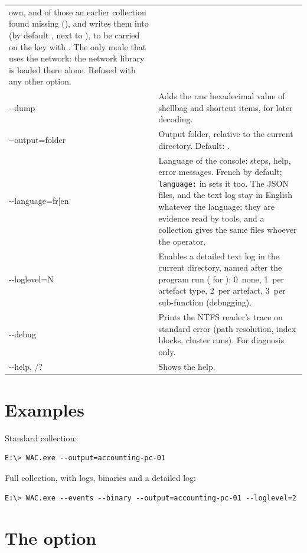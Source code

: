 \documentclass[11pt,a4paper,oneside]{report}
\begin{document}
\begin{longtable}{@{}>{\ttfamily}L{3.2cm}L{11.2cm}@{}}
  own, and of those an earlier collection found missing
  (), and writes them into  (by default
  , next to ), to be carried on the key with
  . The only mode that uses the network: the network library
  is loaded there alone. Refused with any other option. \\
-{}-dump & Adds the raw hexadecimal value of shellbag and  shortcut
  items, for later decoding. \\
-{}-output=folder & Output folder, relative to the current directory. Default:
  . \\
-{}-language=fr|en & Language of the console: steps, help, error messages.
  French by default; \texttt{language:} in  sets it too. The
  JSON files,  and the text log stay in English
  whatever the language: they are evidence read by tools, and a collection
  gives the same files whoever the operator. \\
-{}-loglevel=N & Enables a detailed text log in the current directory, named
  after the program run ( for ): 0~none,
  1~per artefact type, 2~per artefact, 3~per sub-function (debugging). \\
-{}-debug & Prints the NTFS reader's trace on standard error (path resolution,
  index blocks, cluster runs). For diagnosis only. \\
-{}-help, /? & Shows the help. \\
\bottomrule
\end{longtable}

\section{Examples}

Standard collection:
\begin{lstlisting}
E:\> WAC.exe --output=accounting-pc-01
\end{lstlisting}

Full collection, with logs, binaries and a detailed log:
\begin{lstlisting}
E:\> WAC.exe --events --binary --output=accounting-pc-01 --loglevel=2
\end{lstlisting}

\section{The  option}\label{sec:binary}
\end{document}
